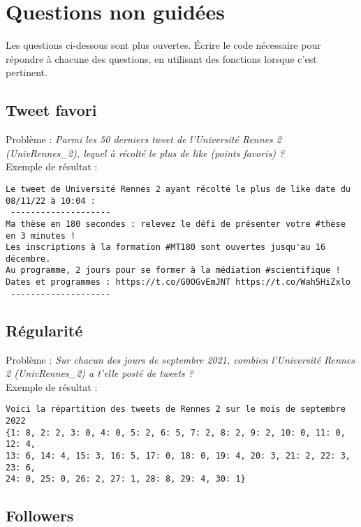 \documentclass[11pt,a4paper]{article}
\begin{document}
\section{Questions non guidées}

Les questions ci-dessous sont plus ouvertes. Écrire le code nécessaire pour répondre à chacune des questions, en utilisant des fonctions lorsque c'est pertinent.

\subsection{Tweet favori}

Problème :
\emph{Parmi les 50 derniers tweet de l'Université Rennes 2 (UnivRennes\_2), lequel à récolté le plus de like (points favoris) ? }
\\

Exemple de résultat : 
\begin{verbatim}
Le tweet de Université Rennes 2 ayant récolté le plus de like date du 08/11/22 à 10:04 : 
 --------------------
Ma thèse en 180 secondes : relevez le défi de présenter votre #thèse en 3 minutes !
Les inscriptions à la formation #MT180 sont ouvertes jusqu'au 16 décembre. 
Au programme, 2 jours pour se former à la médiation #scientifique ! 
Dates et programmes : https://t.co/G0OGvEmJNT https://t.co/Wah5HiZxlo
 --------------------
\end{verbatim}




\subsection{Régularité}

Problème : \emph{Sur chacun des jours de septembre 2021, combien l'Université Rennes 2 (UnivRennes\_2) a t'elle posté de tweets ? }
\\

Exemple de résultat :
\begin{verbatim}
Voici la répartition des tweets de Rennes 2 sur le mois de septembre 2022
{1: 8, 2: 2, 3: 0, 4: 0, 5: 2, 6: 5, 7: 2, 8: 2, 9: 2, 10: 0, 11: 0, 12: 4, 
13: 6, 14: 4, 15: 3, 16: 5, 17: 0, 18: 0, 19: 4, 20: 3, 21: 2, 22: 3, 23: 6, 
24: 0, 25: 0, 26: 2, 27: 1, 28: 8, 29: 4, 30: 1}
\end{verbatim}

\subsection{Followers}
\end{document}
